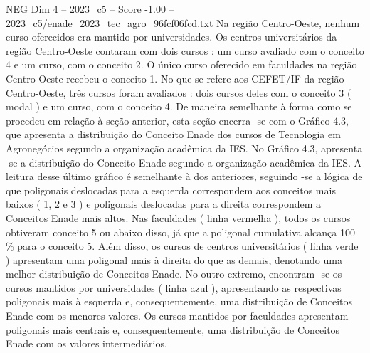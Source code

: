 \begin{textsample}{NEG Dim 4 – 2023\_c5 – Score -1.00 – 2023\_c5/enade\_2023\_tec\_agro\_96fcf06fcd.txt}
Na região Centro-Oeste, nenhum curso oferecidos era mantido por universidades.
Os centros universitários da região Centro-Oeste contaram com dois cursos : um curso avaliado com o conceito 4 e um curso, com o conceito 2.
O único curso oferecido em faculdades na região Centro-Oeste recebeu o conceito 1.
No que se refere aos CEFET/IF da região Centro-Oeste, três cursos foram avaliados : dois cursos deles com o conceito 3 ( modal ) e um curso, com o conceito 4.
De maneira semelhante à forma como se procedeu em relação à seção anterior, esta seção encerra -se com o Gráfico 4.3, que apresenta a distribuição do Conceito Enade dos cursos de Tecnologia em Agronegócios segundo a organização acadêmica da IES.
No Gráfico 4.3, apresenta -se a distribuição do Conceito Enade segundo a organização acadêmica da IES.
A leitura desse último gráfico é semelhante à dos anteriores, seguindo -se a lógica de que poligonais deslocadas para a esquerda correspondem aos conceitos mais baixos ( 1, 2 e 3 ) e poligonais deslocadas para a direita correspondem a Conceitos Enade mais altos.
Nas faculdades ( linha vermelha ), todos os cursos obtiveram conceito 5 ou abaixo disso, já que a poligonal cumulativa alcança 100 \% para o conceito 5.
Além disso, os cursos de centros universitários ( linha verde ) apresentam uma poligonal mais à direita do que as demais, denotando uma melhor distribuição de Conceitos Enade.
No outro extremo, encontram -se os cursos mantidos por universidades ( linha azul ), apresentando as respectivas poligonais mais à esquerda e, consequentemente, uma distribuição de Conceitos Enade com os menores valores.
Os cursos mantidos por faculdades apresentam poligonais mais centrais e, consequentemente, uma distribuição de Conceitos Enade com os valores intermediários.

\end{textsample}
